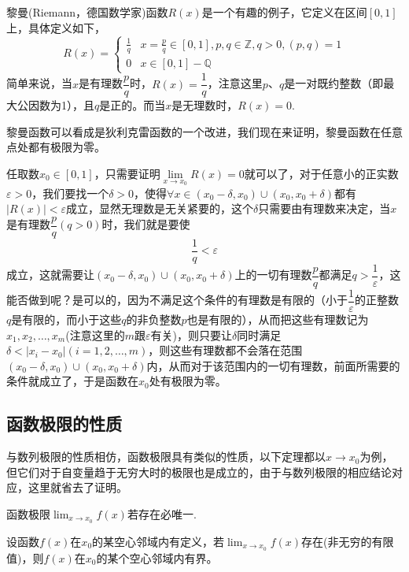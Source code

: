 \begin{example}
  \label{example:limit-of-riemann-function}
  黎曼(Riemann，德国数学家)函数$R(x)$是一个有趣的例子，它定义在区间$[0,1]$上，具体定义如下，
  \[ R(x) =
    \begin{cases}
      \frac{1}{q} & x=\frac{p}{q} \in [0,1], p,q \in \mathbb{Z}, q >0, (p,q)=1 \\
      0 & x \in [0,1]-\mathbb{Q}
    \end{cases}
  \]
  简单来说，当$x$是有理数$\dfrac{p}{q}$时，$R(x)=\dfrac{1}{q}$，注意这里$p$、$q$是一对既约整数（即最大公因数为1），且$q$是正的。而当$x$是无理数时，$R(x)=0$.

  黎曼函数可以看成是狄利克雷函数的一个改进，我们现在来证明，黎曼函数在任意点处都有极限为零。

  任取数$x_0 \in [0,1]$，只需要证明$\lim\limits_{x \to x_0} R(x)=0$就可以了，对于任意小的正实数$\varepsilon>0$，我们要找一个$\delta>0$，使得$\forall x \in (x_0-\delta,x_0)\cup(x_0,x_0+\delta)$都有$|R(x)|<\varepsilon$成立，显然无理数是无关紧要的，这个$\delta$只需要由有理数来决定，当$x$是有理数$\dfrac{p}{q}(q>0)$时，我们就是要使
  \[ \frac{1}{q} < \varepsilon \]
  成立，这就需要让$(x_0-\delta,x_0)\cup(x_0,x_0+\delta)$上的一切有理数$\dfrac{p}{q}$都满足$q > \dfrac{1}{\varepsilon}$，这能否做到呢？是可以的，因为不满足这个条件的有理数是有限的（小于$\dfrac{1}{\varepsilon}$的正整数$q$是有限的，而小于这些$q$的非负整数$p$也是有限的），从而把这些有理数记为$x_1,x_2,\ldots,x_m$(注意这里的$m$跟$\varepsilon$有关)，则只要让$\delta$同时满足$\delta < |x_i-x_0|(i=1,2,\ldots,m)$，则这些有理数都不会落在范围$(x_0-\delta,x_0)\cup(x_0,x_0+\delta)$内，从而对于该范围内的一切有理数，前面所需要的条件就成立了，于是函数在$x_0$处有极限为零。
\end{example}
\subsection{函数极限的性质}
\label{sec:properties-of-function-limit}


与数列极限的性质相仿，函数极限具有类似的性质，以下定理都以$x\to x_0$为例，但它们对于自变量趋于无穷大时的极限也是成立的，由于与数列极限的相应结论对应，这里就省去了证明。

\begin{property}[唯一性]
  函数极限$\lim_{x \to x_0}f(x)$若存在必唯一.
\end{property}

\begin{theorem}[局部有界性]
  设函数$f(x)$在$x_0$的某空心邻域内有定义，若$\lim_{x \to x_0}f(x)$存在(非无穷的有限值)，则$f(x)$在$x_0$的某个空心邻域内有界。
\end{theorem}

